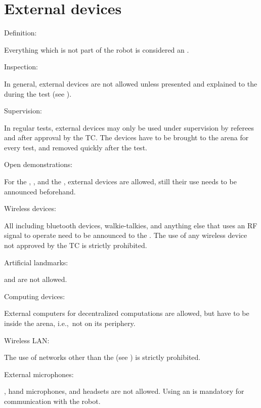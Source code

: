 \section{External devices}\label{rule:roobt_external_devices}
\begin{enumerate}
	{\bf\item Definition:} Everything which is not part of the robot is considered an . 
	{\bf\item Inspection:} In general, external devices are not allowed unless presented and explained to the  during the  test (see ).
	{\bf\item Supervision:} In regular tests, external devices may only be used under supervision by referees and after approval by the TC. The devices have to be brought to the arena for every test, and removed quickly after the test.
	{\bf\item Open demonstrations:} For the , , and the , external devices are allowed, still their use needs to be announced beforehand.
	{\bf\item Wireless devices:} All  including bluetooth devices, walkie-talkies, and anything else that uses an RF signal to operate need to be announced to the . The use of any wireless device not approved by the TC is strictly prohibited.  
	{\bf\item Artificial landmarks:}  and  are not allowed.
	{\bf\item Computing devices:} External computers for decentralized computations are allowed, but have to be inside the arena, i.e.,~not on its periphery.
	{\bf\item Wireless LAN:} The use of networks other than the  (see ) is strictly prohibited.
	{\bf\item External microphones: }, hand microphones, and headsets are not allowed. Using an  is mandatory for communication with the robot.
\end{enumerate}
